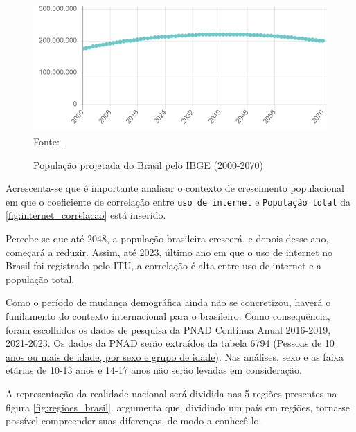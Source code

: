 \begin{figure}[H]
    \centering
    \caption{População projetada do Brasil pelo IBGE (2000-2070)}
    \includegraphics[width=1\linewidth]{figuras/populacao/populacao_brasil.png}
    \label{fig:populacao_brasil}
    \footnotesize{Fonte: \cite{IBGE_populacao_brasil}.}
\end{figure}

Acrescenta-se que é importante analisar o contexto de crescimento populacional em que o coeficiente de correlação entre \texttt{uso de internet} e \texttt{População total} da \ref{fig:internet_correlacao} está inserido. 

Percebe-se que até 2048, a população brasileira crescerá, e depois desse ano, começará a reduzir. Assim, até 2023, último ano em que o uso de internet no Brasil foi registrado pelo ITU, a correlação é alta entre uso de internet e a população total.

Como o período de mudança demográfica ainda não se concretizou, haverá o funilamento do contexto internacional para o brasileiro. Como consequência, foram escolhidos os dados de pesquisa da PNAD Contínua Anual 2016-2019, 2021-2023. Os dados da PNAD serão extraídos da tabela 6794 (\href{Htps://sidra.ibge.gov.br/tabela/6794}{Pessoas de 10 anos ou mais de idade, por sexo e grupo de idade}). Nas análises, sexo e as faixa etárias de 10-13 anos e 14-17 anos não serão levadas em consideração.

A representação da realidade nacional será dividida nas 5 regiões presentes na figura \ref{fig:regioes_brasil}. \cite{HAMAM_2017} argumenta que, dividindo um país em regiões, torna-se possível compreender suas diferenças, de modo a conhecê-lo.

